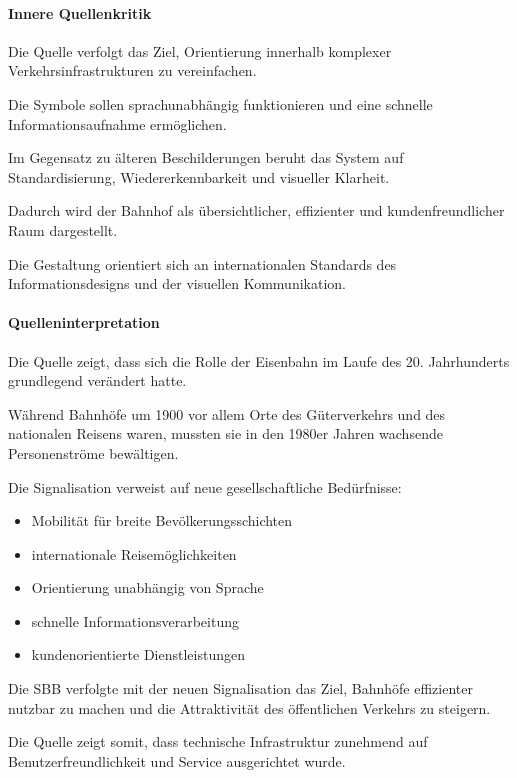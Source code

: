 \paragraph{Innere Quellenkritik}

Die Quelle verfolgt das Ziel,
Orientierung innerhalb komplexer Verkehrsinfrastrukturen
zu vereinfachen.

Die Symbole sollen sprachunabhängig funktionieren
und eine schnelle Informationsaufnahme ermöglichen.

Im Gegensatz zu älteren Beschilderungen
beruht das System auf Standardisierung,
Wiedererkennbarkeit und visueller Klarheit.

Dadurch wird der Bahnhof als übersichtlicher,
effizienter und kundenfreundlicher Raum dargestellt.

Die Gestaltung orientiert sich an internationalen Standards
des Informationsdesigns und der visuellen Kommunikation.

\paragraph{Quelleninterpretation}

Die Quelle zeigt,
dass sich die Rolle der Eisenbahn im Laufe des 20. Jahrhunderts
grundlegend verändert hatte.

Während Bahnhöfe um 1900 vor allem Orte
des Güterverkehrs und des nationalen Reisens waren,
mussten sie in den 1980er Jahren
wachsende Personenströme bewältigen.

Die Signalisation verweist auf neue gesellschaftliche Bedürfnisse:

\begin{itemize}
    \item Mobilität für breite Bevölkerungsschichten
    \item internationale Reisemöglichkeiten
    \item Orientierung unabhängig von Sprache
    \item schnelle Informationsverarbeitung
    \item kundenorientierte Dienstleistungen
\end{itemize}

Die SBB verfolgte mit der neuen Signalisation
das Ziel, Bahnhöfe effizienter nutzbar zu machen
und die Attraktivität des öffentlichen Verkehrs zu steigern.

Die Quelle zeigt somit,
dass technische Infrastruktur zunehmend
auf Benutzerfreundlichkeit und Service ausgerichtet wurde.

